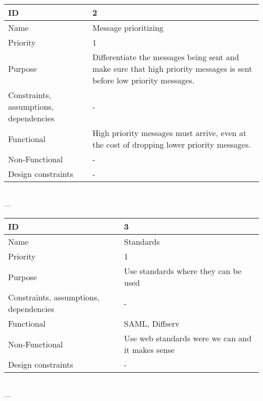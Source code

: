 \begin{center}
    \begin{tabular}{| p{4cm} | p{8cm} |}
        \hline
        ID & 2 \\
        \hline
        Name & Message prioritizing \\
        \hline
        Priority & 1 \\
        \hline
        Purpose & Differentiate the messages being sent and make sure that high priority messages is sent before low priority messages. \\
        \hline 
        Constraints, assumptions, dependencies & -\\
        \hline  
        Functional & High priority messages must arrive, even at the cost of dropping lower priority messages.  \\
        \hline
        Non-Functional & - \\ 
        \hline
        Design constraints & - \\
        \hline
    \end{tabular}
    \\  ---  \\

    \begin{tabular}{| p{4cm} | p{8cm} |}
        \hline
        ID & 3 \\
        \hline
        Name & Standards \\
        \hline
        Priority & 1 \\
        \hline
        Purpose & Use standards where they can be used \\
        \hline 
        Constraints, assumptions, dependencies & -\\
        \hline  
        Functional & SAML, Diffserv \\
        \hline
        Non-Functional & Use web standards were we can and it makes sense \\ 
        \hline
        Design constraints & - \\
        \hline
    \end{tabular}
    \\  ---  \\
    

\end{center}
